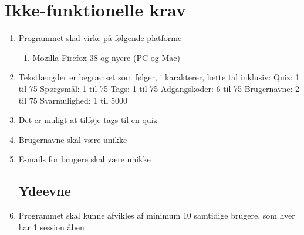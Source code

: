 \section{Ikke-funktionelle krav}
\label{sec:nonFunctional}

\begin{enumerate}
	\subsection*{Brugbarhed}
	\item Programmet skal virke på følgende platforme
	\begin{enumerate}
		\item Mozilla Firefox 38 og nyere (PC og Mac)
	\end{enumerate}
	
	\item Tekstlængder er begrænset som følger, i karakterer, bette tal inklusiv:
	\subitem Quiz: 1 til 75
	\subitem Spørgsmål: 1 til 75
	\subitem Tags: 1 til 75 
	\subitem Adgangskoder: 6 til 75
	\subitem Brugernavne: 2 til 75
	\subitem Svarmulighed: 1 til 5000
	\item Det er muligt at tilføje tags til en quiz
	\item Brugernavne skal være unikke
	\item E-mails for brugere skal være unikke
	
	\subsection*{Ydeevne}
	\item Programmet skal kunne afvikles af minimum 10 samtidige brugere, som hver har 1 session åben
\end{enumerate}